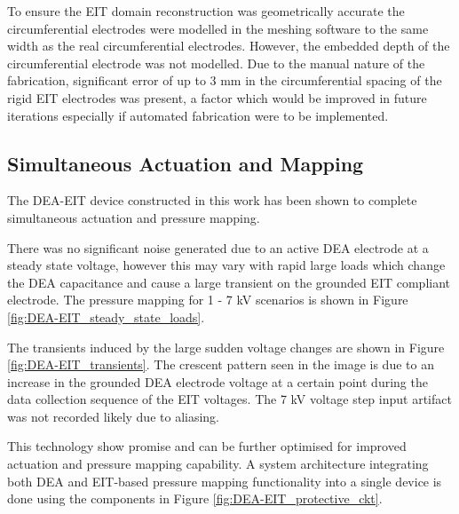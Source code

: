 To ensure the EIT domain reconstruction was geometrically accurate the circumferential electrodes were modelled in the meshing software to the same width as the real circumferential electrodes. However, the embedded depth of the circumferential electrode was not modelled. Due to the manual nature of the fabrication, significant error of up to 3 mm in the circumferential spacing of the rigid EIT electrodes was present, a factor which would be improved in future iterations especially if automated fabrication were to be implemented.


\subsection{Simultaneous Actuation and Mapping}
The DEA-EIT device constructed in this work has been shown to complete simultaneous actuation and pressure mapping.

There was no significant noise generated due to an active DEA electrode at a steady state voltage, however this may vary with rapid large loads which change the DEA capacitance and cause a large transient on the grounded EIT compliant electrode. The pressure mapping for 1 - 7 kV scenarios is shown in Figure \ref{fig:DEA-EIT_steady_state_loads}. 

The transients induced by the large sudden voltage changes are shown in Figure \ref{fig:DEA-EIT_transients}. The crescent pattern seen in the image is due to an increase in the grounded DEA electrode voltage at a certain point during the data collection sequence of the EIT voltages. The 7 kV voltage step input artifact was not recorded likely due to aliasing. 

This technology show promise and can be further optimised for improved actuation and pressure mapping capability. A system architecture integrating both DEA and EIT-based pressure mapping functionality into a single device is done using the components in Figure \ref{fig:DEA-EIT_protective_ckt}. 

